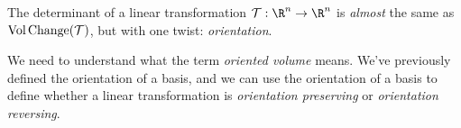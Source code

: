 \begin{center}
\end{center}


The determinant of a linear transformation $\mathcal T:\R^n\to\R^n$ is \emph{almost} the same
as $\operatorname{Vol\hspace{1.5pt}Change}(\mathcal T)$, but with one twist: \emph{orientation}.


We need to understand what the term \emph{oriented volume} means.
We've previously defined the orientation of a basis, and we can use the orientation
of a basis to define whether a linear transformation is \emph{orientation preserving}
or \emph{orientation reversing}.


